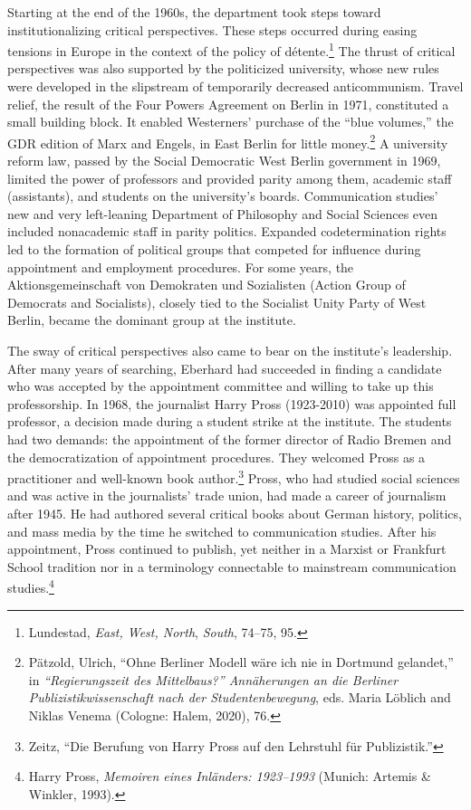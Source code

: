 \documentclass{tufte-handout}
\begin{document}
Starting at the end of the 1960s, the department took steps toward
institutionalizing critical perspectives. These steps occurred during
easing tensions in Europe in the context of the policy of
détente.\footnote{Lundestad, \emph{East, West, North}, \emph{South},
  74--75, 95.} The thrust of critical perspectives was also supported by
the politicized university, whose new rules were developed in the
slipstream of temporarily decreased anticommunism. Travel relief, the
result of the Four Powers Agreement on Berlin in 1971, constituted a
small building block. It enabled Westerners' purchase of the ``blue
volumes,'' the GDR edition of Marx and Engels, in East Berlin for little
money.\footnote{Pätzold, Ulrich, ``Ohne Berliner Modell wäre ich nie in
  Dortmund gelandet,'' in \emph{``Regierungszeit des Mittelbaus?''
  Annäherungen an die Berliner Publizistikwissenschaft nach der
  Studentenbewegung}, eds. Maria Löblich and Niklas Venema (Cologne:
  Halem, 2020), 76.} A university reform law, passed by the Social
Democratic West Berlin government in 1969, limited the power of
professors and provided parity among them, academic staff (assistants),
and students on the university's boards. Communication studies' new and
very left-leaning Department of Philosophy and Social Sciences even
included nonacademic staff in parity politics. Expanded codetermination
rights led to the formation of political groups that competed for
influence during appointment and employment procedures. For some years,
the Aktionsgemeinschaft von Demokraten und Sozialisten (Action Group of
Democrats and Socialists), closely tied to the Socialist Unity Party of
West Berlin, became the dominant group at the institute.

The sway of critical perspectives also came to bear on the institute's
leadership. After many years of searching, Eberhard had succeeded in
finding a candidate who was accepted by the appointment committee and
willing to take up this professorship. In 1968, the journalist Harry
Pross (1923-2010) was appointed full professor, a decision made during a
student strike at the institute. The students had two demands: the
appointment of the former director of Radio Bremen and the
democratization of appointment procedures. They welcomed Pross as a
practitioner and well-known book author.\footnote{Zeitz, ``Die Berufung
  von Harry Pross auf den Lehrstuhl für Publizistik.''} Pross, who had
studied social sciences and was active in the journalists' trade union,
had made a career of journalism after 1945. He had authored several
critical books about German history, politics, and mass media by the
time he switched to communication studies. After his appointment, Pross
continued to publish, yet neither in a Marxist or Frankfurt School
tradition nor in a terminology connectable to mainstream communication
studies.\footnote{Harry Pross, \emph{Memoiren eines Inländers:
  1923--1993} (Munich: Artemis \& Winkler, 1993).}
\end{document}
